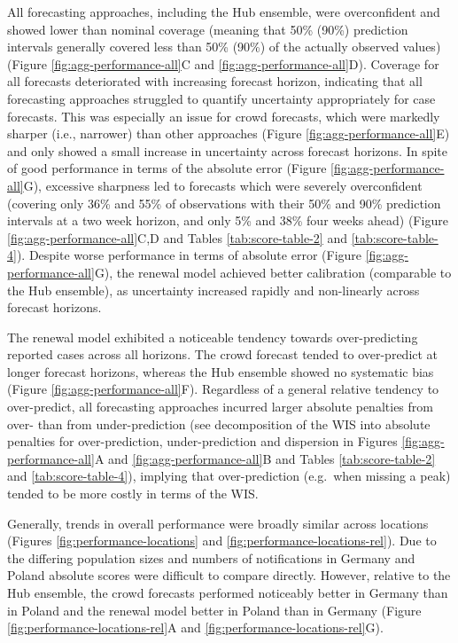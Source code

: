 \documentclass[
]{article}
\begin{document}
All forecasting approaches, including the Hub ensemble, were overconfident and showed lower than nominal coverage (meaning that 50\% (90\%) prediction intervals generally covered less than 50\% (90\%) of the actually observed values) (Figure \ref{fig:agg-performance-all}C and \ref{fig:agg-performance-all}D). Coverage for all forecasts deteriorated with increasing forecast horizon, indicating that all forecasting approaches struggled to quantify uncertainty appropriately for case forecasts. This was especially an issue for crowd forecasts, which were markedly sharper (i.e., narrower) than other approaches (Figure \ref{fig:agg-performance-all}E) and only showed a small increase in uncertainty across forecast horizons. In spite of good performance in terms of the absolute error (Figure \ref{fig:agg-performance-all}G), excessive sharpness led to forecasts which were severely overconfident (covering only 36\% and 55\% of observations with their 50\% and 90\% prediction intervals at a two week horizon, and only 5\% and 38\% four weeks ahead) (Figure \ref{fig:agg-performance-all}C,D and Tables \ref{tab:score-table-2} and \ref{tab:score-table-4}). Despite worse performance in terms of absolute error (Figure \ref{fig:agg-performance-all}G), the renewal model achieved better calibration (comparable to the Hub ensemble), as uncertainty increased rapidly and non-linearly across forecast horizons.

The renewal model exhibited a noticeable tendency towards over-predicting reported cases across all horizons. The crowd forecast tended to over-predict at longer forecast horizons, whereas the Hub ensemble showed no systematic bias (Figure \ref{fig:agg-performance-all}F). Regardless of a general relative tendency to over-predict, all forecasting approaches incurred larger absolute penalties from over- than from under-prediction (see decomposition of the WIS into absolute penalties for over-prediction, under-prediction and dispersion in Figures \ref{fig:agg-performance-all}A and \ref{fig:agg-performance-all}B and Tables \ref{tab:score-table-2} and \ref{tab:score-table-4}), implying that over-prediction (e.g.~when missing a peak) tended to be more costly in terms of the WIS.

Generally, trends in overall performance were broadly similar across locations (Figures \ref{fig:performance-locations} and \ref{fig:performance-locations-rel}).
Due to the differing population sizes and numbers of notifications in Germany and Poland absolute scores were difficult to compare directly. However, relative to the Hub ensemble, the crowd forecasts performed noticeably better in Germany than in Poland and the renewal model better in Poland than in Germany (Figure \ref{fig:performance-locations-rel}A and \ref{fig:performance-locations-rel}G).
\end{document}
